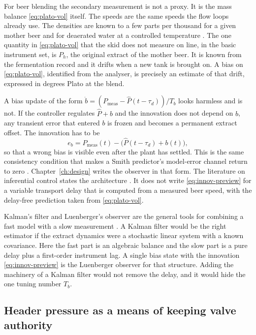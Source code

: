 For beer blending the secondary measurement is not a proxy. It is the mass balance \eqref{eq:plato-vol} itself. The speeds are the same speeds the flow loops already use. The densities are known to a few parts per thousand for a given mother beer and for deaerated water at a controlled temperature \cite{kunze2014brewing}. The one quantity in \eqref{eq:plato-vol} that the skid does not measure on line, in the basic instrument set, is $P_h$, the original extract of the mother beer. It is known from the fermentation record and it drifts when a new tank is brought on. A bias on \eqref{eq:plato-vol}, identified from the analyser, is precisely an estimate of that drift, expressed in degrees Plato at the blend.

A bias update of the form $\dot{b} = (P_{\mathrm{meas}} - \hat{P}(t-\tau_d))/T_b$ looks harmless and is not. If the controller regulates $\hat{P}+b$ and the innovation does not depend on $b$, any transient error that entered $b$ is frozen and becomes a permanent extract offset. The innovation has to be
\begin{equation}
\label{eq:innov-preview}
e_b = P_{\mathrm{meas}}(t) - \big(\hat{P}(t-\tau_d) + b(t)\big),
\end{equation}
so that a wrong bias is visible even after the plant has settled. This is the same consistency condition that makes a Smith predictor's model-error channel return to zero \cite{smith1957closer,normey2008survey}. Chapter~\ref{ch:design} writes the observer in that form. The literature on inferential control states the architecture \cite{seborg2016process,liptak2006handbook}. It does not write \eqref{eq:innov-preview} for a variable transport delay that is computed from a measured beer speed, with the delay-free prediction taken from \eqref{eq:plato-vol}.

Kalman's filter and Luenberger's observer are the general tools for combining a fast model with a slow measurement \cite{kalman1960new,luenberger1971introduction}. A Kalman filter would be the right estimator if the extract dynamics were a stochastic linear system with a known covariance. Here the fast part is an algebraic balance and the slow part is a pure delay plus a first-order instrument lag. A single bias state with the innovation \eqref{eq:innov-preview} is the Luenberger observer for that structure. Adding the machinery of a Kalman filter would not remove the delay, and it would hide the one tuning number $T_b$.

\subsection{Header pressure as a means of keeping valve authority}

